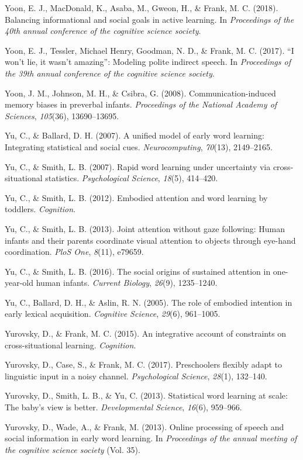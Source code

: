\documentclass[oneside]{report}
\begin{document}
\hypertarget{ref-yoon2018balancing}{}
Yoon, E. J., MacDonald, K., Asaba, M., Gweon, H., \& Frank, M. C.
(2018). Balancing informational and social goals in active learning. In
\emph{Proceedings of the 40th annual conference of the cognitive science
society}.

\hypertarget{ref-yoonwon}{}
Yoon, E. J., Tessler, Michael Henry, Goodman, N. D., \& Frank, M. C.
(2017). ``I won't lie, it wasn't amazing'': Modeling polite indirect
speech. In \emph{Proceedings of the 39th annual conference of the
cognitive science society}.

\hypertarget{ref-yoon2008communication}{}
Yoon, J. M., Johnson, M. H., \& Csibra, G. (2008). Communication-induced
memory biases in preverbal infants. \emph{Proceedings of the National
Academy of Sciences}, \emph{105}(36), 13690--13695.

\hypertarget{ref-yu2007unified}{}
Yu, C., \& Ballard, D. H. (2007). A unified model of early word
learning: Integrating statistical and social cues.
\emph{Neurocomputing}, \emph{70}(13), 2149--2165.

\hypertarget{ref-yu2007rapid}{}
Yu, C., \& Smith, L. B. (2007). Rapid word learning under uncertainty
via cross-situational statistics. \emph{Psychological Science},
\emph{18}(5), 414--420.

\hypertarget{ref-yu2012embodied}{}
Yu, C., \& Smith, L. B. (2012). Embodied attention and word learning by
toddlers. \emph{Cognition}.

\hypertarget{ref-yu2013joint}{}
Yu, C., \& Smith, L. B. (2013). Joint attention without gaze following:
Human infants and their parents coordinate visual attention to objects
through eye-hand coordination. \emph{PloS One}, \emph{8}(11), e79659.

\hypertarget{ref-yu2016social}{}
Yu, C., \& Smith, L. B. (2016). The social origins of sustained
attention in one-year-old human infants. \emph{Current Biology},
\emph{26}(9), 1235--1240.

\hypertarget{ref-yu2005role}{}
Yu, C., Ballard, D. H., \& Aslin, R. N. (2005). The role of embodied
intention in early lexical acquisition. \emph{Cognitive Science},
\emph{29}(6), 961--1005.

\hypertarget{ref-yurovsky2014algorithmic}{}
Yurovsky, D., \& Frank, M. C. (2015). An integrative account of
constraints on cross-situational learning. \emph{Cognition}.

\hypertarget{ref-yurovsky2017preschoolers}{}
Yurovsky, D., Case, S., \& Frank, M. C. (2017). Preschoolers flexibly
adapt to linguistic input in a noisy channel. \emph{Psychological
Science}, \emph{28}(1), 132--140.

\hypertarget{ref-yurovsky2013statistical}{}
Yurovsky, D., Smith, L. B., \& Yu, C. (2013). Statistical word learning
at scale: The baby's view is better. \emph{Developmental Science},
\emph{16}(6), 959--966.

\hypertarget{ref-yurovsky2013online}{}
Yurovsky, D., Wade, A., \& Frank, M. (2013). Online processing of speech
and social information in early word learning. In \emph{Proceedings of
the annual meeting of the cognitive science society} (Vol. 35).


\end{document}
